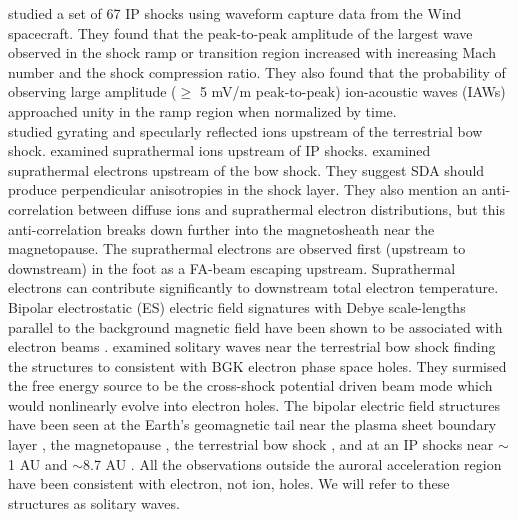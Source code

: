\documentclass[grl]{AGUTeX}
\begin{document}
\begin{article}
\indent  \citet{wilsoniii07a} studied a set of 67 IP shocks using waveform capture data from the Wind spacecraft.  They found that the peak-to-peak amplitude of the largest wave observed in the shock ramp or transition region increased with increasing Mach number and the shock compression ratio.  They also found that the probability of observing large amplitude ($\geq$ 5 mV/m peak-to-peak) ion-acoustic waves (IAWs) approached unity in the ramp region when normalized by time.  \\
\indent  \citet{gosling82a,paschmann82a,meziane98,thomsen83b,thomsen85b} studied gyrating and specularly reflected ions upstream of the terrestrial bow shock.  \citet{gosling84a} examined suprathermal ions upstream of IP shocks.  \citet{gosling89b} examined suprathermal electrons upstream of the bow shock.  They suggest SDA should produce perpendicular anisotropies in the shock layer.  They also mention an anti-correlation between diffuse ions and suprathermal electron distributions, but this anti-correlation breaks down further into the magnetosheath near the magnetopause.  The suprathermal electrons are observed first (upstream to downstream) in the foot as a FA-beam escaping upstream.  Suprathermal electrons can contribute significantly to downstream total electron temperature.  \\


\indent  Bipolar electrostatic (ES) electric field signatures with Debye scale-lengths parallel to the background magnetic field have been shown to be associated with electron beams \citep{ergun98b}.  \citet{bale02a} examined solitary waves near the terrestrial bow shock finding the structures to consistent with BGK electron phase space holes.  They surmised the free energy source to be the cross-shock potential driven beam mode which would nonlinearly evolve into electron holes.  The bipolar electric field structures have been seen at the Earth's geomagnetic tail near the plasma sheet boundary layer \citep{cattell05a,ergun98a}, the magnetopause \citep{cattell02a,cattell03a}, the terrestrial bow shock \citep{bale02a,cattell03a}, and at an IP shocks near $\sim$1 AU \citep{wilsoniii07a} and $\sim$8.7 AU \citep{williams05a}.  All the observations outside the auroral acceleration region have been consistent with electron, not ion, holes.  We will refer to these structures as solitary waves.  \\



\end{article}
\end{document}
